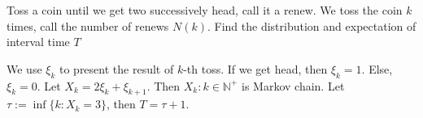 \documentclass{ctexart}
\newif\ifpreface
\begin{document}
\large
\iffalse 
\setlength{\baselineskip}{1.2em}
\ifpreface
    
\else
\maketitle
\fi
\fi
{}
\begin{problem}\label{pro:-1}
  Toss a coin until we get two successively head, call it a renew. 
  We toss the coin \(k\) times, call the number of renews \(N(k)\). 
  Find the distribution and expectation of interval time \(T\)
\end{problem}

\begin{solution}
  We use \(\xi_k\) to present the result of \(k\)-th toss. 
  If we get head, then \(\xi_k=1\). Else, \(\xi_k=0\). 
  Let \(X_k=2\xi_k+\xi_{k+1}\). Then \(X_k:k \in \mathbb{N}^+\) is Markov chain. 
  Let \(\tau:=\inf \{k:X_k=3\}\), then \(T=\tau+1\). 
  
\end{solution}
\end{document}
